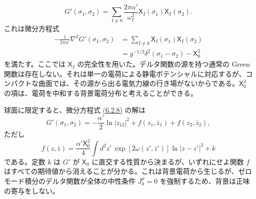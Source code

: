 \begin{equation}
G'(\sigma_1,\sigma_2)=\sum_{I\ne0}\frac{2\pi\alpha'}{\omega_I^2}
\mathsf X_I(\sigma_1)\mathsf X_I(\sigma_2).
\tag{6.2.7}\label{eq:6.2.7}
\end{equation}
これは微分方程式
\begin{equation}
\begin{aligned}
-\frac1{2\pi\alpha'}\nabla^2G'(\sigma_1,\sigma_2)
&=\sum_{I\ne0}\mathsf X_I(\sigma_1)\mathsf X_I(\sigma_2)\\
&=g^{-1/2}\delta^2(\sigma_1-\sigma_2)-\mathsf X_0^2
\end{aligned}
\tag{6.2.8}\label{eq:6.2.8}
\end{equation}
を満たす。ここでは $\mathsf X_I$ の完全性を用いた。デルタ関数の源を持つ通常の Green 関数は存在しない。それは単一の電荷による静電ポテンシャルに対応するが、コンパクトな曲面では、その源から出る電気力線の行き場がないからである。$\mathsf X_0^2$ の項は、電荷を中和する背景電荷分布と考えることができる。


球面に限定すると、微分方程式 \hyperref[eq:6.2.8]{(6.2.8)} の解は
\begin{equation}
G'(\sigma_1,\sigma_2)=-\frac{\alpha'}2\ln|z_{12}|^2
+f(z_1,\bar z_1)+f(z_2,\bar z_2),
\tag{6.2.9}\label{eq:6.2.9}
\end{equation}
ただし
\begin{equation}
f(z,\bar z)=\frac{\alpha'\mathsf X_0^2}4
\int d^2z'\,\exp[2\omega(z',\bar z')]\ln|z-z'|^2+k
\tag{6.2.10}\label{eq:6.2.10}
\end{equation}
である。定数 $k$ は $G'$ が $\mathsf X_0$ に直交する性質から決まるが、いずれにせよ関数 $f$ はすべての期待値から消えることが分かる。これは背景電荷から生じるが、ゼロモード積分のデルタ関数が全体の中性条件 $J_0^\mu=0$ を強制するため、背景は正味の寄与をしない。

